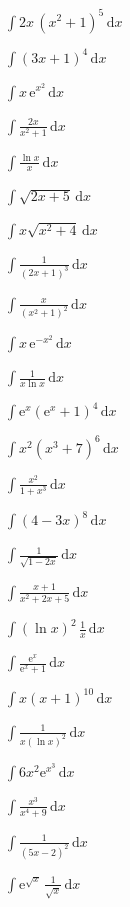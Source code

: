\begin{problems}
  \item $\displaystyle\int 2x\,(x^{2}+1)^{5}\,\mathrm{d}x$
  \item $\displaystyle\int (3x+1)^{4}\,\mathrm{d}x$
  \item $\displaystyle\int x\,\mathrm{e}^{x^{2}}\,\mathrm{d}x$
  \item $\displaystyle\int \frac{2x}{x^{2}+1}\,\mathrm{d}x$
  \item $\displaystyle\int \frac{\ln x}{x}\,\mathrm{d}x$
  \item $\displaystyle\int \sqrt{2x+5}\,\mathrm{d}x$
  \item $\displaystyle\int x\sqrt{x^{2}+4}\,\mathrm{d}x$
  \item $\displaystyle\int \frac{1}{(2x+1)^{3}}\,\mathrm{d}x$
  \item $\displaystyle\int \frac{x}{(x^{2}+1)^{2}}\,\mathrm{d}x$
  \item $\displaystyle\int x\,\mathrm{e}^{-x^{2}}\,\mathrm{d}x$
  \item $\displaystyle\int \frac{1}{x\ln x}\,\mathrm{d}x$
  \item $\displaystyle\int \mathrm{e}^{x}(\mathrm{e}^{x}+1)^{4}\,\mathrm{d}x$
  \item $\displaystyle\int x^{2}(x^{3}+7)^{6}\,\mathrm{d}x$
  \item $\displaystyle\int \frac{x^{2}}{1+x^{3}}\,\mathrm{d}x$
  \item $\displaystyle\int (4-3x)^{8}\,\mathrm{d}x$
  \item $\displaystyle\int \frac{1}{\sqrt{1-2x}}\,\mathrm{d}x$
  \item $\displaystyle\int \frac{x+1}{x^{2}+2x+5}\,\mathrm{d}x$
  \item $\displaystyle\int (\ln x)^{2}\,\frac{1}{x}\,\mathrm{d}x$
  \item $\displaystyle\int \frac{\mathrm{e}^{x}}{\mathrm{e}^{x}+1}\,\mathrm{d}x$
  \item $\displaystyle\int x(x+1)^{10}\,\mathrm{d}x$
  \item $\displaystyle\int \frac{1}{x(\ln x)^{2}}\,\mathrm{d}x$
  \item $\displaystyle\int 6x^{2}\mathrm{e}^{x^{3}}\,\mathrm{d}x$
  \item $\displaystyle\int \frac{x^{3}}{x^{4}+9}\,\mathrm{d}x$
  \item $\displaystyle\int \frac{1}{(5x-2)^{2}}\,\mathrm{d}x$
  \item $\displaystyle\int \mathrm{e}^{\sqrt{x}}\,\frac{1}{\sqrt{x}}\,\mathrm{d}x$
\end{problems}

